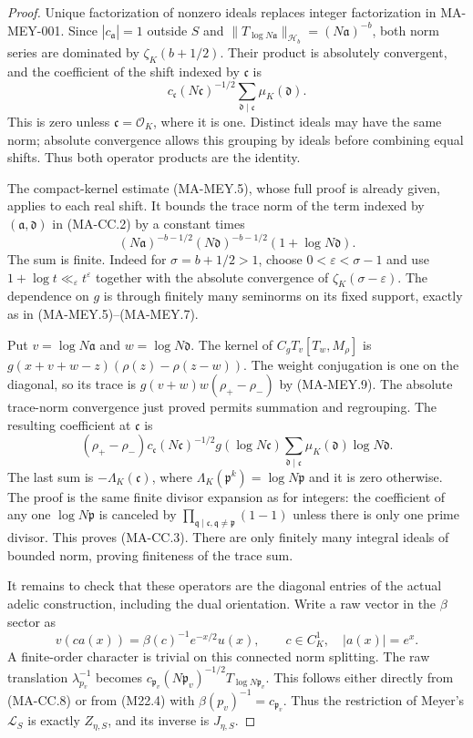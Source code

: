 \begin{proof}
Unique factorization of nonzero ideals replaces integer
factorization in MA-MEY-001.  Since $|c_{\mathfrak a}|=1$ outside
$S$ and $\|T_{\log N\mathfrak a}\|_{\mathcal H_b}
=(N\mathfrak a)^{-b}$, both norm series are dominated by
$\zeta_K(b+1/2)$.  Their product is absolutely convergent, and
the coefficient of the shift indexed by $\mathfrak c$ is
\[
 c_{\mathfrak c}(N\mathfrak c)^{-1/2}
                \sum_{\mathfrak d\mid\mathfrak c}\mu_K(\mathfrak d).
\]
This is zero unless $\mathfrak c=\mathcal O_K$, where it is one.
Distinct ideals may have the same norm; absolute convergence
allows this grouping by ideals before combining equal shifts.
Thus both operator products are the identity.

The compact-kernel estimate (MA-MEY.5), whose full proof is already
given, applies to each real shift.  It bounds the trace norm of
the term indexed by $(\mathfrak a,\mathfrak d)$ in (MA-CC.2) by
a constant times
\[
 (N\mathfrak a)^{-b-1/2}(N\mathfrak d)^{-b-1/2}
                                      (1+\log N\mathfrak d).
\]
The sum is finite.  Indeed for $\sigma=b+1/2>1$, choose
$0<\varepsilon<\sigma-1$ and use
$1+\log t\ll_\varepsilon t^\varepsilon$ together with the
absolute convergence of $\zeta_K(\sigma-\varepsilon)$.
The dependence on $g$ is through finitely many seminorms on its
fixed support, exactly as in (MA-MEY.5)--(MA-MEY.7).

Put $v=\log N\mathfrak a$ and $w=\log N\mathfrak d$.
The kernel of $C_gT_v[T_w,M_\rho]$ is
$g(x+v+w-z)(\rho(z)-\rho(z-w))$.  The weight conjugation is one
on the diagonal, so its trace is
$g(v+w)w(\rho_+-\rho_-)$ by (MA-MEY.9).
The absolute trace-norm convergence just proved permits summation
and regrouping.  The resulting coefficient at $\mathfrak c$ is
\[
 (\rho_+-\rho_-)
 c_{\mathfrak c}(N\mathfrak c)^{-1/2}g(\log N\mathfrak c)
 \sum_{\mathfrak d\mid\mathfrak c}
                          \mu_K(\mathfrak d)\log N\mathfrak d.
\]
The last sum is $-\Lambda_K(\mathfrak c)$, where
$\Lambda_K(\mathfrak p^k)=\log N\mathfrak p$ and it is zero
otherwise.  The proof is the same finite divisor expansion as
for integers: the coefficient of any one $\log N\mathfrak p$
is canceled by $\prod_{\mathfrak q\mid\mathfrak c,
\mathfrak q\ne\mathfrak p}(1-1)$ unless there is only one prime
divisor.  This proves (MA-CC.3).  There are only finitely many
integral ideals of bounded norm, proving finiteness of the trace sum.

It remains to check that these operators are the diagonal entries
of the actual adelic construction, including the dual orientation.
Write a raw vector in the $\beta$ sector as
\[
 v(ca(x))=\beta(c)^{-1}e^{-x/2}u(x),
 \qquad c\in C_K^1,\quad |a(x)|=e^x.
\tag{MA-CC.8}
\]
A finite-order character is trivial on this connected norm
splitting.  The raw translation $\lambda_{p_v}^{-1}$ becomes
$c_{\mathfrak p_v}(N\mathfrak p_v)^{-1/2}
T_{\log N\mathfrak p_v}$.  This follows either directly from
(MA-CC.8) or from (M22.4) with
$\beta(p_v)^{-1}=c_{\mathfrak p_v}$.
Thus the restriction of Meyer's $\mathcal L_S$ is exactly
$Z_{\eta,S}$, and its inverse is $J_{\eta,S}$.


\end{proof}
